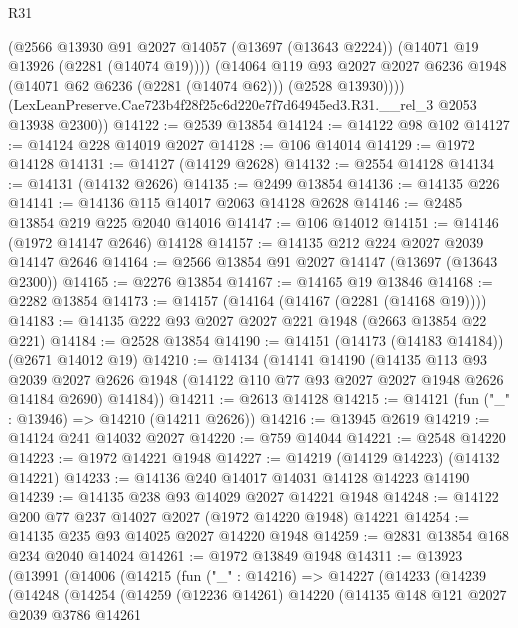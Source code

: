 \begin{lexlean}{R31}
\begin{coremodule}
          (@2566
            @13930
            @91
            @2027
            @14057
            (@13697 (@13643 @2224))
            (@14071 @19 @13926 (@2281 (@14074 @19))))
          (@14064
            @119
            @93
            @2027
            @2027
            @6236
            @1948
            (@14071 @62 @6236 (@2281 (@14074 @62)))
            (@2528 @13930))))
      (LexLeanPreserve.Cae723b4f28f25c6d220e7f7d64945ed3.R31.__rel_3 @2053 @13938 @2300))
@14122 := @2539 @13854
@14124 := @14122 @98 @102
@14127 := @14124 @228 @14019 @2027
@14128 := @106 @14014
@14129 := @1972 @14128
@14131 := @14127 (@14129 @2628)
@14132 := @2554 @14128
@14134 := @14131 (@14132 @2626)
@14135 := @2499 @13854
@14136 := @14135 @226
@14141 := @14136 @115 @14017 @2063 @14128 @2628
@14146 := @2485 @13854 @219 @225 @2040 @14016
@14147 := @106 @14012
@14151 := @14146 (@1972 @14147 @2646) @14128
@14157 := @14135 @212 @224 @2027 @2039 @14147 @2646
@14164 := @2566 @13854 @91 @2027 @14147 (@13697 (@13643 @2300))
@14165 := @2276 @13854
@14167 := @14165 @19 @13846
@14168 := @2282 @13854
@14173 := @14157 (@14164 (@14167 (@2281 (@14168 @19))))
@14183 := @14135 @222 @93 @2027 @2027 @221 @1948 (@2663 @13854 @22 @221)
@14184 := @2528 @13854
@14190 := @14151 (@14173 (@14183 @14184)) (@2671 @14012 @19)
@14210 := @14134
    (@14141
      @14190
      (@14135
        @113
        @93
        @2039
        @2027
        @2626
        @1948
        (@14122 @110 @77 @93 @2027 @2027 @1948 @2626 @14184 @2690)
        @14184))
@14211 := @2613 @14128
@14215 := @14121 (fun ("_" : @13946) => @14210 (@14211 @2626))
@14216 := @13945 @2619
@14219 := @14124 @241 @14032 @2027
@14220 := @759 @14044
@14221 := @2548 @14220
@14223 := @1972 @14221 @1948
@14227 := @14219 (@14129 @14223) (@14132 @14221)
@14233 := @14136 @240 @14017 @14031 @14128 @14223 @14190
@14239 := @14135 @238 @93 @14029 @2027 @14221 @1948
@14248 := @14122 @200 @77 @237 @14027 @2027 (@1972 @14220 @1948) @14221
@14254 := @14135 @235 @93 @14025 @2027 @14220 @1948
@14259 := @2831 @13854 @168 @234 @2040 @14024
@14261 := @1972 @13849 @1948
@14311 := @13923
    (@13991
      (@14006
        (@14215
          (fun ("_" : @14216) =>
          @14227
            (@14233
              (@14239
                (@14248
                  (@14254
                    (@14259
                      (@12236 @14261)
                      @14220
                      (@14135
                        @148
                        @121
                        @2027
                        @2039
                        @3786
                        @14261

\end{coremodule}
\end{lexlean}

